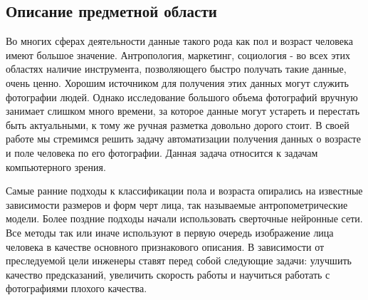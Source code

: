 \subsection{Описание предметной области}\label{subsec:описание-предметной-области}
Во многих сферах деятельности данные такого рода как пол и возраст человека имеют большое значение.
Антропология, маркетинг, социология - во всех этих областях наличие инструмента, позволяющего быстро получать такие данные, очень ценно.
Хорошим источником для получения этих данных могут служить фотографии людей.
Однако исследование большого объема фотографий вручную занимает слишком много времени,
за которое данные могут устареть и перестать быть актуальными,
к тому же ручная разметка довольно дорого стоит.
В своей работе мы стремимся решить задачу автоматизации получения данных о возрасте и поле человека по его фотографии.
Данная задача относится к задачам компьютерного зрения.
\par Самые ранние подходы к классификации пола и возраста опирались на известные зависимости размеров и форм черт лица,
так называемые антропометрические модели.
Более поздние подходы начали использовать сверточные нейронные сети.
Все методы так или иначе используют в первую очередь изображение лица человека в качестве основного признакового описания.
В зависимости от преследуемой цели инженеры ставят перед собой следующие задачи: улучшить качество предсказаний,
увеличить скорость работы и научиться работать с фотографиями плохого качества.

